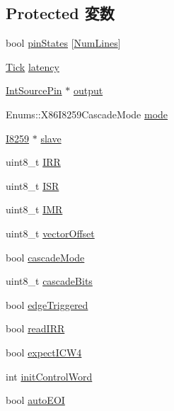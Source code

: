 \subsection*{Protected 変数}
\begin{DoxyCompactItemize}
\item 
bool \hyperlink{classX86ISA_1_1I8259_a0cfba6b99782832feb54152b679f416b}{pinStates} \mbox{[}\hyperlink{classX86ISA_1_1I8259_a394ed08d7eedb814e519387710d14243}{NumLines}\mbox{]}
\item 
\hyperlink{base_2types_8hh_a5c8ed81b7d238c9083e1037ba6d61643}{Tick} \hyperlink{classX86ISA_1_1I8259_ac8d8966078cc047949fd1bca8feb21b6}{latency}
\item 
\hyperlink{classX86ISA_1_1IntSourcePin}{IntSourcePin} $\ast$ \hyperlink{classX86ISA_1_1I8259_a4a4fd7b72e62a3c4ab95cb11fc722c39}{output}
\item 
Enums::X86I8259CascadeMode \hyperlink{classX86ISA_1_1I8259_a7a104649c5cfddf388e2176ea01ee60a}{mode}
\item 
\hyperlink{classX86ISA_1_1I8259}{I8259} $\ast$ \hyperlink{classX86ISA_1_1I8259_a8c6f2e957037d32e002591662762b0b9}{slave}
\item 
uint8\_\-t \hyperlink{classX86ISA_1_1I8259_a3a6aa8a662aa901296e6ee90e345354b}{IRR}
\item 
uint8\_\-t \hyperlink{classX86ISA_1_1I8259_ac8961b62ac66b7dc8dea1d7285864393}{ISR}
\item 
uint8\_\-t \hyperlink{classX86ISA_1_1I8259_a08462597fc835560f5d4103a0c7684ce}{IMR}
\item 
uint8\_\-t \hyperlink{classX86ISA_1_1I8259_a0dab9c49a4355dabc77b494a0f2ee7af}{vectorOffset}
\item 
bool \hyperlink{classX86ISA_1_1I8259_a9d88ee8939dbad3f6bc3fd19a7ab5cbf}{cascadeMode}
\item 
uint8\_\-t \hyperlink{classX86ISA_1_1I8259_a452774b3f7a251c0ab94933cdd9cf850}{cascadeBits}
\item 
bool \hyperlink{classX86ISA_1_1I8259_a60290bd6fbff9031bf6c9ee4fd498f1d}{edgeTriggered}
\item 
bool \hyperlink{classX86ISA_1_1I8259_a6e286ff90731d05a67b6e48701b35cb8}{readIRR}
\item 
bool \hyperlink{classX86ISA_1_1I8259_ae6e7ac9619987193c010dc534cdbcac0}{expectICW4}
\item 
int \hyperlink{classX86ISA_1_1I8259_a73a298dcdb4f7e881c60561a06b9d0c1}{initControlWord}
\item 
bool \hyperlink{classX86ISA_1_1I8259_ae34d3675f724192acf53ead552d94230}{autoEOI}
\end{DoxyCompactItemize}
